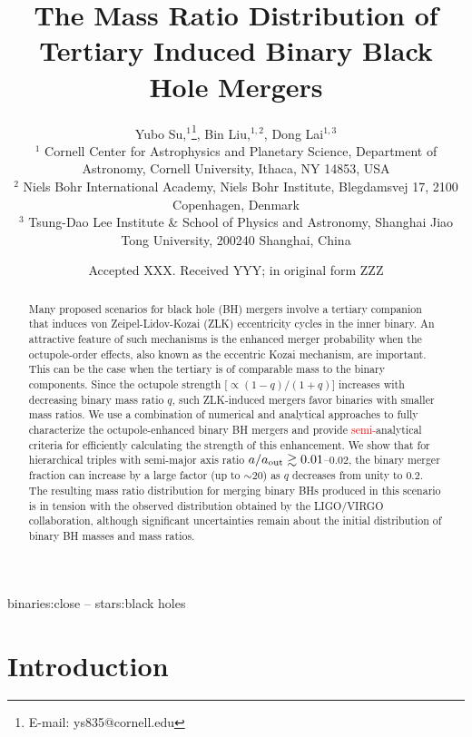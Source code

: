 \documentclass[
        fleqn,
        usenatbib,
    ]{mnras}
\title[Mass Ratio Distribution]{The Mass Ratio Distribution of
Tertiary Induced Binary Black Hole Mergers}
\author[Y. Su et\ al.]{
Yubo Su,$^1$\thanks{E-mail: ys835@cornell.edu},
Bin Liu,$^{1,2}$,
Dong Lai$^{1,3}$
\\
$^1$ Cornell Center for Astrophysics and Planetary Science, Department of
Astronomy, Cornell University, Ithaca, NY 14853, USA\\
$^2$ Niels Bohr International Academy, Niels Bohr Institute, Blegdamsvej 17,
2100 Copenhagen, Denmark\\
$^3$ Tsung-Dao Lee Institute \& School of Physics and Astronomy, Shanghai Jiao
Tong University, 200240 Shanghai, China
}
\date{Accepted XXX\@. Received YYY\@; in original form ZZZ}
\begin{document}
\label{firstpage}
\pagerange{\pageref{firstpage}--\pageref{lastpage}}
\maketitle

\begin{abstract}
    Many proposed scenarios for black hole (BH) mergers involve a tertiary
    companion that induces von Zeipel-Lidov-Kozai (ZLK) eccentricity cycles in
    the inner binary. An attractive feature of such mechanisms is the enhanced
    merger probability when the octupole-order effects, also known as the
    eccentric Kozai mechanism, are important. This can be the case when the
    tertiary is of comparable mass to the binary components. Since the octupole
    strength [$\propto (1-q)/(1+q)$] increases with decreasing binary mass ratio
    $q$, such ZLK-induced mergers favor binaries with smaller mass ratios. We
    use a combination of numerical and analytical approaches to fully
    characterize the octupole-enhanced binary BH mergers and provide
    \textcolor{red}{semi-}analytical criteria for efficiently calculating the
    strength of this enhancement. We show that for hierarchical triples with
    semi-major axis ratio $a/a_{\rm out}\gtrsim 0.01$--$0.02$, the binary merger
    fraction can increase by a large factor (up to $\sim 20$) as $q$ decreases
    from unity to $0.2$. The resulting mass ratio distribution for merging
    binary BHs produced in this scenario is in tension with the observed
    distribution obtained by the LIGO/VIRGO collaboration, although significant
    uncertainties remain about the initial distribution of binary BH masses and
    mass ratios.
\end{abstract}

\begin{keywords}
binaries:close -- stars:black holes %
\end{keywords}

\section{Introduction}\label{s:intro}
\end{document}
